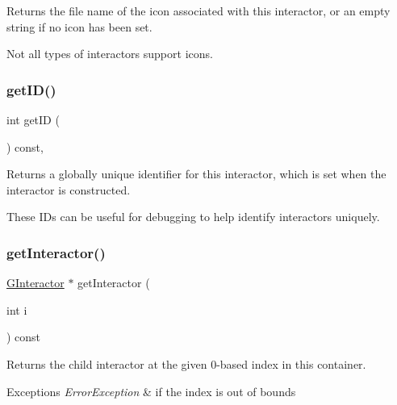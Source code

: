 Returns the file name of the icon associated with this interactor, or an empty string if no icon has been set. 

Not all types of interactors support icons. \mbox{\label{classGInteractor_a9c9659a6c6ba66b4107ba59c95a24241}} 
\subsubsection{\texorpdfstring{get\+I\+D()}{getID()}}
{\footnotesize\ttfamily int get\+ID (\begin{DoxyParamCaption}{ }\end{DoxyParamCaption}) const\hspace{0.3cm}{\ttfamily [virtual]}, {\ttfamily [inherited]}}



Returns a globally unique identifier for this interactor, which is set when the interactor is constructed. 

These I\+Ds can be useful for debugging to help identify interactors uniquely. \mbox{\label{classGContainer_ac59d7bae6154f6f8791c7f1fd856b157}} 
\subsubsection{\texorpdfstring{get\+Interactor()}{getInteractor()}}
{\footnotesize\ttfamily \mbox{\hyperlink{classGInteractor}{G\+Interactor}} $\ast$ get\+Interactor (\begin{DoxyParamCaption}\item[{int}]{i }\end{DoxyParamCaption}) const\hspace{0.3cm}{\ttfamily [virtual]}}



Returns the child interactor at the given 0-\/based index in this container. 


\begin{DoxyExceptions}{Exceptions}
{\em Error\+Exception} & if the index is out of bounds \\
\hline
\end{DoxyExceptions}
\mbox{\label{classGContainer_ad31230cd6d220466fbd18fd21d133f67}} 
